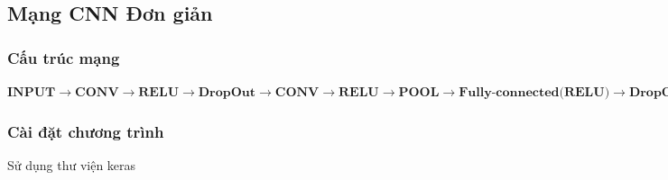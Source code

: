 \documentclass[a4paper,12pt]{report}
\begin{document}
\subsection{Mạng CNN Đơn giản}
\subsubsection{Cấu trúc mạng}
\small{
$\textbf{INPUT} \rightarrow \textbf{CONV} \rightarrow \textbf{RELU} \rightarrow \textbf{DropOut} \rightarrow \textbf{CONV} \rightarrow \textbf{RELU} \rightarrow \textbf{POOL} \rightarrow \textbf{Fully-connected(RELU)}\rightarrow \textbf{DropOut} \rightarrow \textbf{Fully-connected(softmax)}$
}
\subsubsection{Cài đặt chương trình}
Sử dụng thư viện keras
\end{document}
